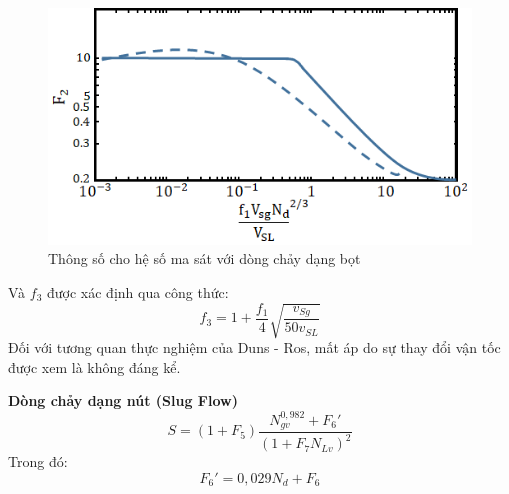 \documentclass[12pt,a4paper]{report}
\begin{document}
	\begin{figure}[h]
		\centering
		\includegraphics[scale=0.9]{Fig/params_for_friction_bubble_flow_duns_ros.png}
		\caption{Thông số cho hệ số ma sát với dòng chảy dạng bọt}
		\label{fig:params_for_friction_bubble_flow_duns_ros}
	\end{figure}
\newline
Và $f_3$ được xác định qua công thức:
	\begin{equation}
    f_3 = 1 + \dfrac{f_1}{4}\sqrt{\dfrac{v_{Sg}}{50v_{SL}}}
	\end{equation}
Đối với tương quan thực nghiệm của Duns - Ros, mất áp do sự thay đổi vận tốc được xem là không đáng kể.

\textbf{Dòng chảy dạng nút (Slug Flow)}
	\begin{equation}
    S = (1 + F_5)\dfrac{N_{gv}^{0,982}+F_6'}{(1 + F_{7}N_{Lv})^2}
	\end{equation}
Trong đó:
	\begin{equation}
F_6' = 0,029N_d + F_6
	\end{equation}
\end{document}

